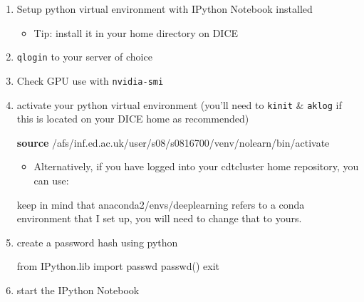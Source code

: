 \documentclass[]{article}
\newenvironment{Shaded}{\begin{snugshade}}{\end{snugshade}}
\newcommand{\KeywordTok}[1]{\textcolor[rgb]{0.13,0.29,0.53}{\textbf{{#1}}}}
\newcommand{\CharTok}[1]{\textcolor[rgb]{0.31,0.60,0.02}{{#1}}}
\newcommand{\OtherTok}[1]{\textcolor[rgb]{0.56,0.35,0.01}{{#1}}}
\newcommand{\NormalTok}[1]{{#1}}
\begin{document}
\begin{enumerate}
\def\labelenumi{\arabic{enumi}.}
\item
  Setup python virtual environment with IPython Notebook installed

  \begin{itemize}
  \itemsep1pt\parskip0pt
  \item
    Tip: install it in your home directory on DICE
  \end{itemize}
\item
  \texttt{qlogin} to your server of choice
\item
  Check GPU use with \texttt{nvidia-smi}
\item
  activate your python virtual environment (you'll need to
  \texttt{kinit} \& \texttt{aklog} if this is located on your DICE home
  as recommended)

\begin{Shaded}
\begin{Highlighting}[]
\KeywordTok{source} \NormalTok{/afs/inf.ed.ac.uk/user/s08/s0816700/venv/nolearn/bin/activate}
\end{Highlighting}
\end{Shaded}

  \begin{itemize}
  \itemsep1pt\parskip0pt
  \item
    Alternatively, if you have logged into your cdtcluster home
    repository, you can use:
  \end{itemize}

\begin{Shaded}
\end{Shaded}

  keep in mind that anaconda2/envs/deeplearning refers to a conda
  environment that I set up, you will need to change that to yours.
\item
  create a password hash using python

\begin{Shaded}
\begin{Highlighting}[]
\CharTok{from} \NormalTok{IPython.lib }\CharTok{import} \NormalTok{passwd}
\NormalTok{passwd()}
\NormalTok{exit}
\end{Highlighting}
\end{Shaded}
\item
  start the IPython Notebook


\end{enumerate}
\end{document}
